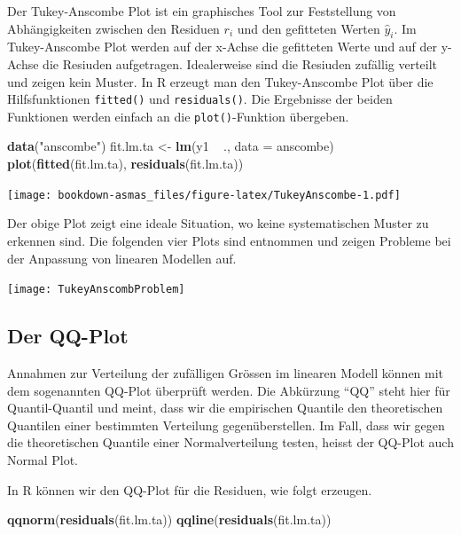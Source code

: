 \documentclass[]{book}
\newenvironment{Shaded}{\begin{snugshade}}{\end{snugshade}}
\newcommand{\KeywordTok}[1]{\textcolor[rgb]{0.13,0.29,0.53}{\textbf{{#1}}}}
\newcommand{\DataTypeTok}[1]{\textcolor[rgb]{0.13,0.29,0.53}{{#1}}}
\newcommand{\StringTok}[1]{\textcolor[rgb]{0.31,0.60,0.02}{{#1}}}
\newcommand{\NormalTok}[1]{{#1}}
\begin{document}
Der Tukey-Anscombe Plot ist ein graphisches Tool zur Feststellung von
Abhängigkeiten zwischen den Residuen \(r_i\) und den gefitteten Werten
\(\hat{y}_i\). Im Tukey-Anscombe Plot werden auf der x-Achse die
gefitteten Werte und auf der y-Achse die Resiuden aufgetragen.
Idealerweise sind die Resiuden zufällig verteilt und zeigen kein Muster.
In R erzeugt man den Tukey-Anscombe Plot über die Hilfsfunktionen
\texttt{fitted()} und \texttt{residuals()}. Die Ergebnisse der beiden
Funktionen werden einfach an die \texttt{plot()}-Funktion übergeben.

\begin{Shaded}
\begin{Highlighting}[]
\KeywordTok{data}\NormalTok{(}\StringTok{"anscombe"}\NormalTok{)}
\NormalTok{fit.lm.ta <-}\StringTok{ }\KeywordTok{lm}\NormalTok{(y1 ~}\StringTok{ }\NormalTok{., }\DataTypeTok{data =} \NormalTok{anscombe)}
\KeywordTok{plot}\NormalTok{(}\KeywordTok{fitted}\NormalTok{(fit.lm.ta), }\KeywordTok{residuals}\NormalTok{(fit.lm.ta))}
\end{Highlighting}
\end{Shaded}

\texttt{[image: bookdown-asmas\_files/figure-latex/TukeyAnscombe-1.pdf]}

Der obige Plot zeigt eine ideale Situation, wo keine systematischen
Muster zu erkennen sind. Die folgenden vier Plots sind \citep{BM2014}
entnommen und zeigen Probleme bei der Anpassung von linearen Modellen
auf.

\begin{center}\texttt{[image: TukeyAnscombProblem]} \end{center}

\subsection{Der QQ-Plot}\label{der-qq-plot}

Annahmen zur Verteilung der zufälligen Grössen im linearen Modell können
mit dem sogenannten QQ-Plot überprüft werden. Die Abkürzung ``QQ'' steht
hier für Quantil-Quantil und meint, dass wir die empirischen Quantile
den theoretischen Quantilen einer bestimmten Verteilung
gegenüberstellen. Im Fall, dass wir gegen die theoretischen Quantile
einer Normalverteilung testen, heisst der QQ-Plot auch Normal Plot.

In R können wir den QQ-Plot für die Residuen, wie folgt erzeugen.

\begin{Shaded}
\begin{Highlighting}[]
\KeywordTok{qqnorm}\NormalTok{(}\KeywordTok{residuals}\NormalTok{(fit.lm.ta))}
\KeywordTok{qqline}\NormalTok{(}\KeywordTok{residuals}\NormalTok{(fit.lm.ta))}
\end{Highlighting}
\end{Shaded}
\end{document}
